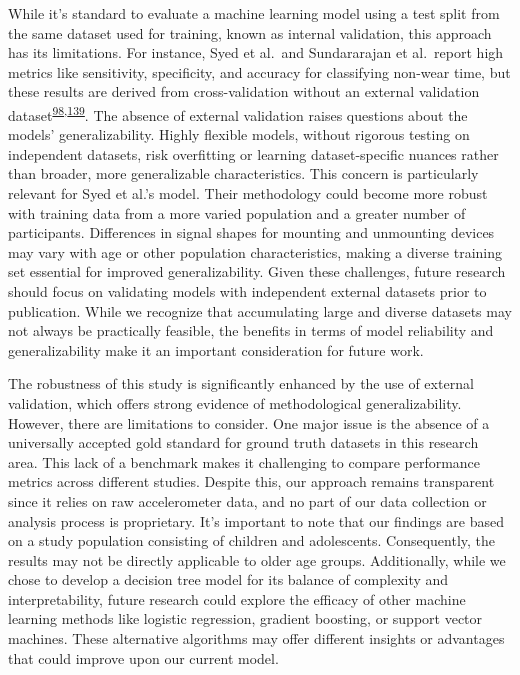 \documentclass[
  10pt,
]{scrbook}
\begin{document}
While it's standard to evaluate a machine learning model using a test
split from the same dataset used for training, known as internal
validation, this approach has its limitations. For instance, Syed et
al.~and Sundararajan et al.~report high metrics like sensitivity,
specificity, and accuracy for classifying non-wear time, but these
results are derived from cross-validation without an external validation
dataset\textsuperscript{\protect\hyperlink{ref-sundararajan_sleep_2021}{98},\protect\hyperlink{ref-syed_evaluating_2020}{139}}.
The absence of external validation raises questions about the models'
generalizability. Highly flexible models, without rigorous testing on
independent datasets, risk overfitting or learning dataset-specific
nuances rather than broader, more generalizable characteristics. This
concern is particularly relevant for Syed et al.'s model. Their
methodology could become more robust with training data from a more
varied population and a greater number of participants. Differences in
signal shapes for mounting and unmounting devices may vary with age or
other population characteristics, making a diverse training set
essential for improved generalizability. Given these challenges, future
research should focus on validating models with independent external
datasets prior to publication. While we recognize that accumulating
large and diverse datasets may not always be practically feasible, the
benefits in terms of model reliability and generalizability make it an
important consideration for future work.

The robustness of this study is significantly enhanced by the use of
external validation, which offers strong evidence of methodological
generalizability. However, there are limitations to consider. One major
issue is the absence of a universally accepted gold standard for ground
truth datasets in this research area. This lack of a benchmark makes it
challenging to compare performance metrics across different studies.
Despite this, our approach remains transparent since it relies on raw
accelerometer data, and no part of our data collection or analysis
process is proprietary. It's important to note that our findings are
based on a study population consisting of children and adolescents.
Consequently, the results may not be directly applicable to older age
groups. Additionally, while we chose to develop a decision tree model
for its balance of complexity and interpretability, future research
could explore the efficacy of other machine learning methods like
logistic regression, gradient boosting, or support vector machines.
These alternative algorithms may offer different insights or advantages
that could improve upon our current model.
\end{document}

